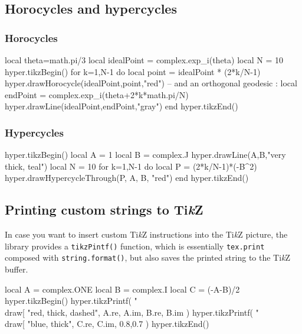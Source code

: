 \documentclass{article}
\newcommand{\TikZ}{Ti\emph{k}Z}
\begin{document}
\subsection{Horocycles and hypercycles}

\subsubsection{Horocycles}
\begin{codeandresult}
\begin{luacode*}
local theta=math.pi/3
local idealPoint = complex.exp_i(theta)
local N = 10
hyper.tikzBegin()
for k=1,N-1 do
	local point = idealPoint * (2*k/N-1)
	hyper.drawHorocycle(idealPoint,point,"red")
	-- and an orthogonal geodesic : 
	local endPoint = complex.exp_i(theta+2*k*math.pi/N)
	hyper.drawLine(idealPoint,endPoint,"gray")
end
hyper.tikzEnd()
\end{luacode*}
\end{codeandresult}

\subsubsection{Hypercycles}
\begin{codeandresult}
\begin{luacode*}
hyper.tikzBegin()
local A = 1
local B = complex.J
hyper.drawLine(A,B,"very thick, teal")
local N = 10
for k=1,N-1 do
	local P = (2*k/N-1)*(-B^2)
	hyper.drawHypercycleThrough(P, A, B, "red")
end
hyper.tikzEnd()
\end{luacode*}
\end{codeandresult}


\subsection{Printing custom strings to \TikZ}
 
 In case you want to insert custom \TikZ{} instructions into the \TikZ{} picture, the library provides a \texttt{tikzPintf()} function, which  is essentially \texttt{tex.print} composed with \texttt{string.format()}, but also saves the printed string to the \TikZ{} buffer.

\begin{codeandresult}
\begin{luacode*}
local A = complex.ONE
local B = complex.I
local C = (-A-B)/2
hyper.tikzBegin()
hyper.tikzPrintf(
	"\\draw[%
	"red, thick, dashed", A.re, A.im, B.re, B.im
)
hyper.tikzPrintf(
	"\\draw[%
	"blue, thick", C.re, C.im, 0.8,0.7
) 
hyper.tikzEnd()
\end{luacode*}
\end{codeandresult}
\end{document}
